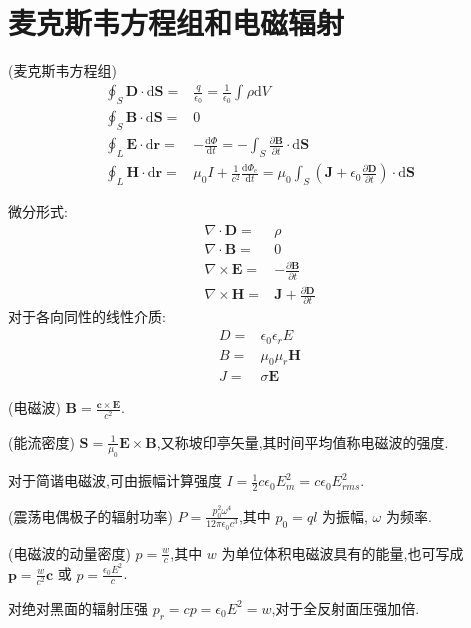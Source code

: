     \section{麦克斯韦方程组和电磁辐射}
    \begin{theorem}
        (麦克斯韦方程组) 
        \begin{align}
            \oint_{S}^{}\bm{D}\cdot \mathrm{d}\bm{S}=&\frac{q}{\epsilon_0}=\frac{1}{\epsilon_0}\int_{}^{}\rho\mathrm{d}V\nonumber\\
            \oint_{S}^{}\bm{B}\cdot \mathrm{d}\bm{S}=&0\nonumber\\
            \oint_{L}^{}\bm{E}\cdot\mathrm{d}\bm{r}=&-\frac{\mathrm{d}\Phi}{\mathrm{d}t}=-\int_{S}^{}\frac{\partial \bm{B}}{\partial t}\cdot\mathrm{d}\bm{S}\nonumber\\
            \oint_{L}^{}\bm{H}\cdot\mathrm{d}\bm{r}=&\mu_0I+\frac{1}{c^2}\frac{\mathrm{d}\Phi_{e}}{\mathrm{d}t}=\mu_0\int_{S}^{}\left( \bm{J}+\epsilon_0 \frac{\partial \bm{D}}{\partial t} \right) \cdot\mathrm{d}\bm{S}\nonumber
        \end{align}
        
        微分形式:
        \begin{align}
            \nabla\cdot \bm{D}=&\rho\nonumber\\
            \nabla\cdot \bm{B}=&0\nonumber\\
            \nabla\times \bm{E}=&-\frac{\partial \bm{B}}{\partial t}\nonumber\\
            \nabla\times \bm{H}=&\bm{J}+\frac{\partial \bm{D}}{\partial t}\nonumber
        \end{align}
        对于各向同性的线性介质:
        \begin{align}
            D=&\epsilon_0\epsilon_{r}E\nonumber\\
            B=&\mu_0\mu_{r}\bm{H}\nonumber\\
            J=&\sigma \bm{E}\nonumber
        \end{align}
    \end{theorem}
    \begin{theorem}
        (电磁波) $\bm{B}=\frac{\bm{c}\times \bm{E}}{c^2}$.
    \end{theorem}
    \begin{definition}
        (能流密度) $\bm{S}=\frac{1}{\mu_0}\bm{E}\times \bm{B}$,又称坡印亭矢量,其时间平均值称电磁波的强度.
    \end{definition}
    对于简谐电磁波,可由振幅计算强度 $I=\frac{1}{2}c\epsilon_0 E^2_{m}=c\epsilon_0E_{rms}^2$.
    \begin{theorem}
        (震荡电偶极子的辐射功率) $P=\frac{p_0^2\omega^{4}}{12\pi\epsilon_0c^3}$,其中 $p_0=ql$ 为振幅, $\omega$ 为频率.
    \end{theorem}
    \begin{definition}
        (电磁波的动量密度) $p=\frac{w}{c}$,其中 $w$ 为单位体积电磁波具有的能量,也可写成 $\bm{p}=\frac{w}{c^2}\bm{c}$ 或 $p=\frac{\epsilon_0 E^2}{c}$.
    \end{definition}
    对绝对黑面的辐射压强 $p_{r}=cp=\epsilon_0E^2=w$,对于全反射面压强加倍.
